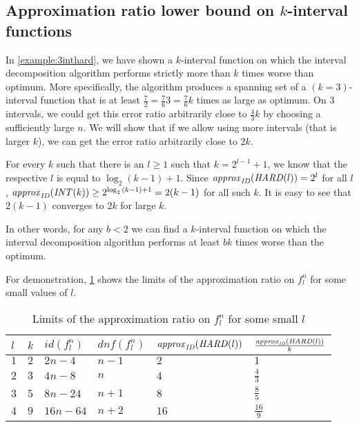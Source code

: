 \subsection{Approximation ratio lower bound on $k$-interval functions}

In \cref{example:3inthard},
we have shown a $k$-interval function
on which the interval decomposition algorithm performs
strictly more than $k$ times worse than optimum.
More specifically,
the algorithm produces a spanning set
of a $(k=3)$-interval function
that is at least
$\frac{7}{2}
= \frac{7}{6} 3
= \frac{7}{6} k$
times as large as optimum.
On $3$ intervals,
we could get this error ratio arbitrarily close
to $\frac{4}{3} k$
by choosing a sufficiently large $n$.
We will show that if we allow using more intervals
(that is larger $k$),
we can get the error ratio arbitrarily close to $2k$.

For every $k$ such that
there is an $l \geq 1$ such that $k = 2^{l-1} + 1$,
we know that the respective $l$
is equal to $\log_2{(k-1)} + 1$.
Since $\mathit{approx}_{\mathit{ID}} (\mathit{HARD}(l)) = 2^l$ for all $l$,
$\mathit{approx}_{\mathit{ID}} (\mathit{INT} (k)) \geq 2^{\log_2{(k-1)} + 1}
= 2(k-1)$
for all such $k$.
It is easy to see that $2(k-1)$ converges to $2k$
for large $k$.

In other words,
for any $b < 2$
we can find a $k$-interval function
on which the interval decomposition algorithm
performs at least $bk$ times worse than the optimum.

For demonstration,
\cref{tab:hardsmalll} shows the limits
of the approximation ratio on $f_l^n$
for some small values of $l$.

\begin{table}[h]
\centering
\begin{tabular}{l|lllll}
$l$
& $k$ %
& $id(f_l^n)$ %
& $dnf(f_l^n)$ %
& $\mathit{approx}_{\mathit{ID}} (\mathit{HARD}(l))$ %
& $\frac{\mathit{approx}_{\mathit{ID}} (\mathit{HARD}(l))}{k}$
\\
\hline
$1$ & $2$ & $2n-4$ & $n-1$ & $2$ & $1$ \\
$2$ & $3$ & $4n-8$ & $n$ & $4$ & $\frac{4}{3}$ \\
$3$ & $5$ & $8n-24$ & $n+1$ & $8$ & $\frac{8}{5}$ \\
$4$ & $9$ & $16n-64$ & $n+2$ & $16$ & $\frac{16}{9}$
\end{tabular}
\caption{Limits of the approximation ratio
on $f_l^n$
for some small $l$}
\label{tab:hardsmalll}
\end{table}

